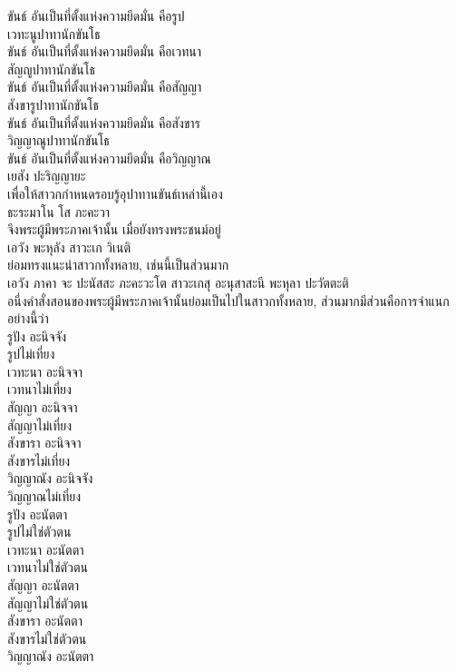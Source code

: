 \documentclass{article}
\begin{document}
\indent ขันธ์ อันเป็นที่ตั้งแห่งความยึดมั่น คือรูป\\
เวทะนูปาทานักขันโธ\\
\indent ขันธ์ อันเป็นที่ตั้งแห่งความยึดมั่น คือเวทนา\\
สัญญูปาทานักขันโธ\\
\indent ขันธ์ อันเป็นที่ตั้งแห่งความยึดมั่น คือสัญญา\\
สังขารูปาทานักขันโธ\\
\indent ขันธ์ อันเป็นที่ตั้งแห่งความยึดมั่น คือสังขาร\\
วิญญาณูปาทานักขันโธ\\
\indent ขันธ์ อันเป็นที่ตั้งแห่งความยึดมั่น คือวิญญาณ\\
เยสัง ปะริญญายะ\\
\indent เพื่อให้สาวกกำหนดรอบรู้อุปาทานขันธ์เหล่านี้เอง\\
ธะระมาโน โส ภะคะวา\\
\indent จึงพระผู้มีพระภาคเจ้านั้น เมื่อยังทรงพระชนม์อยู่\\
เอวัง พะหุลัง สาวะเก วิเนติ\\
\indent ย่อมทรงแนะนำสาวกทั้งหลาย, เช่นนี้เป็นส่วนมาก\\
เอวัง ภาคา จะ ปะนัสสะ ภะคะวะโต สาวะเกสุ อะนุสาสะนี พะหุลา ปะวัตตะติ\\
\indent อนึ่งคำสั่งสอนของพระผู้มีพระภาคเจ้านั้นย่อมเป็นไปในสาวกทั้งหลาย,
ส่วนมากมีส่วนคือการจำแนกอย่างนี้ว่า\\
รูปัง อะนิจจัง\\
\indent รูปไม่เที่ยง\\
เวทะนา อะนิจจา\\
\indent เวทนาไม่เที่ยง\\
สัญญา อะนิจจา\\
\indent สัญญาไม่เที่ยง\\
สังขารา อะนิจจา\\
\indent สังขารไม่เที่ยง\\
วิญญาณัง อะนิจจัง\\
\indent วิญญาณไม่เที่ยง\\
รูปัง อะนัตตา\\
\indent รูปไม่ใช่ตัวตน\\
เวทะนา อะนัตตา\\
\indent เวทนาไม่ใช่ตัวตน\\
สัญญา อะนัตตา\\
\indent สัญญาไม่ใช่ตัวตน\\
สังขารา อะนัตตา\\
\indent สังขารไม่ใช่ตัวตน\\
วิญญาณัง อะนัตตา\\
\end{document}
